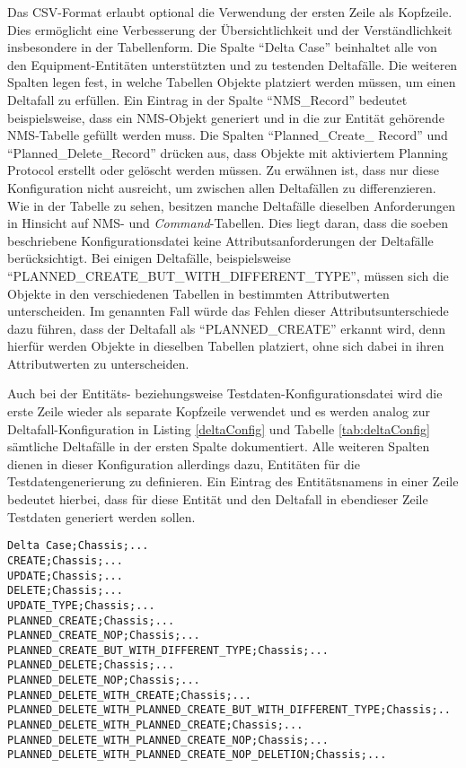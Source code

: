 Das \ac{CSV}-Format erlaubt optional die Verwendung der ersten Zeile als Kopfzeile. Dies ermöglicht eine Verbesserung der Übersichtlichkeit und der Verständlichkeit insbesondere in der Tabellenform. Die Spalte \enquote{Delta Case} beinhaltet alle von den Equipment-Entitäten unterstützten und zu testenden Deltafälle. Die weiteren Spalten legen fest, in welche Tabellen Objekte platziert werden müssen, um einen Deltafall zu erfüllen. Ein Eintrag in der Spalte \enquote{NMS\_Record} bedeutet beispielsweise, dass ein \ac{NMS}-Objekt generiert und in die zur Entität gehörende \ac{NMS}-Tabelle gefüllt werden muss. Die Spalten \enquote{Planned\_Create\_ Record} und \enquote{Planned\_Delete\_Record} drücken aus, dass Objekte mit aktiviertem Planning Protocol erstellt oder gelöscht werden müssen. Zu erwähnen ist, dass nur diese Konfiguration nicht ausreicht, um zwischen allen Deltafällen zu differenzieren. Wie in der Tabelle zu sehen, besitzen manche Deltafälle dieselben Anforderungen in Hinsicht auf \ac{NMS}- und \textit{Command}-Tabellen. Dies liegt daran, dass die soeben beschriebene Konfigurationsdatei keine Attributsanforderungen der Deltafälle berücksichtigt. Bei einigen Deltafälle, beispielsweise \enquote{PLANNED\_CREATE\_BUT\_WITH\_DIFFERENT\_TYPE}, müssen sich die Objekte in den verschiedenen Tabellen in bestimmten Attributwerten unterscheiden. Im genannten Fall würde das Fehlen dieser Attributsunterschiede dazu führen, dass der Deltafall als \enquote{PLANNED\_CREATE} erkannt wird, denn hierfür werden Objekte in dieselben Tabellen platziert, ohne sich dabei in ihren Attributwerten zu unterscheiden.

\newpage
Auch bei der Entitäts- beziehungsweise Testdaten-Konfigurationsdatei wird die erste Zeile wieder als separate Kopfzeile verwendet und es werden analog zur Deltafall-Konfiguration in Listing \ref{deltaConfig} und Tabelle \ref{tab:deltaConfig} sämtliche Deltafälle in der ersten Spalte dokumentiert. Alle weiteren Spalten dienen in dieser Konfiguration allerdings dazu, Entitäten für die Testdatengenerierung zu definieren. Ein Eintrag des Entitätsnamens in einer Zeile bedeutet hierbei, dass für diese Entität und den Deltafall in ebendieser Zeile Testdaten generiert werden sollen.

\begin{lstlisting}[caption=Konfigurationsdatei für Entitäten im CSV-Format, label=entityConfig,language=csv,basicstyle=\footnotesize\ttfamily]
Delta Case;Chassis;...
CREATE;Chassis;...
UPDATE;Chassis;...
DELETE;Chassis;...
UPDATE_TYPE;Chassis;...
PLANNED_CREATE;Chassis;...
PLANNED_CREATE_NOP;Chassis;...
PLANNED_CREATE_BUT_WITH_DIFFERENT_TYPE;Chassis;...
PLANNED_DELETE;Chassis;...
PLANNED_DELETE_NOP;Chassis;...
PLANNED_DELETE_WITH_CREATE;Chassis;...
PLANNED_DELETE_WITH_PLANNED_CREATE_BUT_WITH_DIFFERENT_TYPE;Chassis;..
PLANNED_DELETE_WITH_PLANNED_CREATE;Chassis;...
PLANNED_DELETE_WITH_PLANNED_CREATE_NOP;Chassis;...
PLANNED_DELETE_WITH_PLANNED_CREATE_NOP_DELETION;Chassis;...
\end{lstlisting}

